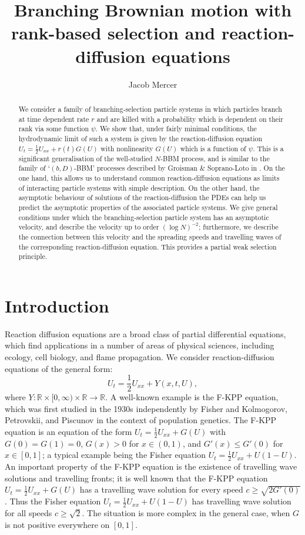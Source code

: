 \documentclass{article}
\title{Branching Brownian motion with rank-based selection and reaction-diffusion equations}
\author{Jacob Mercer}
\date{}
\newcommand{\B}[1]{\mathbb{#1}}
\begin{document}
\maketitle

\begin{abstract}
    We consider a family of branching-selection particle systems in which particles branch at time dependent rate $r$ and are killed with a probability which is dependent on their rank via some function $\psi$. We show that, under fairly minimal conditions, the hydrodynamic limit of such a system is given by the reaction-diffusion equation $U_t = \frac12 U_{xx} + r(t)G(U)$ with nonlinearity $G(U)$ which is a function of $\psi$. This is a significant generalisation of the well-studied $N$-BBM process, and is similar to the family of `$(b,D)$-BBM' processes described by Groisman \& Soprano-Loto in \cite{rankDependentBBM}. On the one hand, this allows us to understand common reaction-diffusion equations as limits of interacting particle systems with simple description. On the other hand, the asymptotic behaviour of solutions of the reaction-diffusion the PDEs can help us predict the asymptotic properties of the associated particle systems. We give general conditions under which the branching-selection particle system has an asymptotic velocity, and describe the velocity up to order $(\log N)^{-2}$; furthermore, we describe the connection between this velocity and the spreading speeds and travelling waves of the corresponding reaction-diffusion equation. This provides a partial weak selection principle.
\end{abstract}

\section{Introduction}

Reaction diffusion equations are a broad class of partial differential equations, which find applications in a number of areas of physical sciences, including ecology, cell biology, and flame propagation. We consider reaction-diffusion equations of the general form:
$$U_t = \frac12 U_{xx} + Y(x,t,U),$$
where $Y:\B{R}\times [0,\infty)\times \B{R}\to \B{R}$. A well-known example is the F-KPP equation, which was first studied in the 1930s independently by Fisher \cite{fisher} and Kolmogorov, Petrovskii, and Piscunov \cite{kpp} in the context of population genetics. The F-KPP equation is an equation of the form $U_t=\frac12U_{xx}+G(U)$ with $G(0)=G(1)=0$, $G(x)>0$ for $x\in (0,1)$, and $G'(x)\leq G'(0)$ for $x\in [0,1]$; a typical example being the Fisher equation $U_t=\frac12U_{xx}+U(1-U)$. An important property of the F-KPP equation is the existence of travelling wave solutions and travelling fronts; it is well known that the F-KPP equation $U_t=\frac12U_{xx}+G(U)$ has a travelling wave solution for every speed $c\geq \sqrt{2G'(0)}$. Thus the Fisher equation $U_t=\frac12U_{xx}+U(1-U)$ has travelling wave solution for all speeds $c\geq \sqrt{2}$. The situation is more complex in the general case, when $G$ is not positive everywhere on $[0,1]$. 
\end{document}
